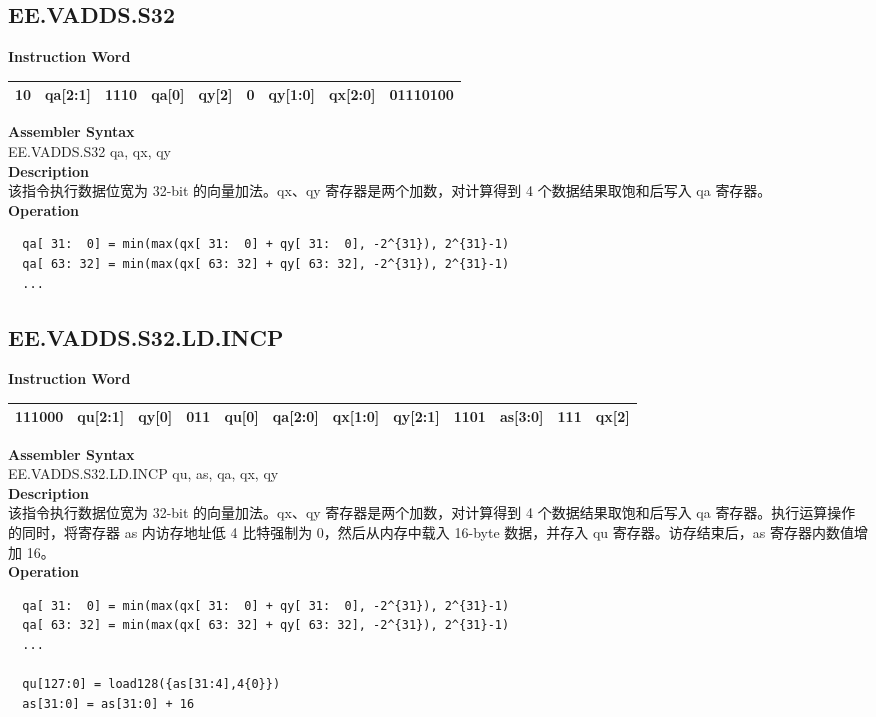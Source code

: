 \clearpage
\subsection{EE.VADDS.S32}\label{instruction:EEVADDSS32}
\setlength\tabcolsep{6pt}
\textbf{Instruction Word} \\
\begin{tabular}{|c|c|c|c|c|c|c|c|c|}
	\hline
	10 & qa[2:1] & 1110 & qa[0] & qy[2] & 0 & qy[1:0] & qx[2:0] & 01110100 \\
	\hline
\end{tabular}

\textbf{Assembler Syntax} \\
EE.VADDS.S32 qa, qx, qy \\
\textbf{Description} \\
该指令执行数据位宽为 32-bit 的向量加法。qx、qy 寄存器是两个加数，对计算得到 4 个数据结果取饱和后写入 qa 寄存器。\\
\textbf{Operation}
\begin{lstlisting}
  qa[ 31:  0] = min(max(qx[ 31:  0] + qy[ 31:  0], -2^{31}), 2^{31}-1)
  qa[ 63: 32] = min(max(qx[ 63: 32] + qy[ 63: 32], -2^{31}), 2^{31}-1)
  ...
\end{lstlisting}

\clearpage
\subsection{EE.VADDS.S32.LD.INCP}\label{instruction:EEVADDSS32LDINCP}
\setlength\tabcolsep{6pt}
\textbf{Instruction Word} \\
\begin{tabular}{|c|c|c|c|c|c|c|c|c|c|c|c|}
	\hline
	111000 & qu[2:1] & qy[0] & 011 & qu[0] & qa[2:0] & qx[1:0] & qy[2:1] & 1101 & as[3:0] & 111 & qx[2] \\
	\hline
\end{tabular}

\textbf{Assembler Syntax} \\
EE.VADDS.S32.LD.INCP qu, as, qa, qx, qy \\
\textbf{Description} \\
该指令执行数据位宽为 32-bit 的向量加法。qx、qy 寄存器是两个加数，对计算得到 4 个数据结果取饱和后写入 qa 寄存器。执行运算操作的同时，将寄存器 as 内访存地址低 4 比特强制为 0，然后从内存中载入 16-byte 数据，并存入 qu 寄存器。访存结束后，as 寄存器内数值增加 16。\\
\textbf{Operation}
\begin{lstlisting}
  qa[ 31:  0] = min(max(qx[ 31:  0] + qy[ 31:  0], -2^{31}), 2^{31}-1)
  qa[ 63: 32] = min(max(qx[ 63: 32] + qy[ 63: 32], -2^{31}), 2^{31}-1)
  ...

  qu[127:0] = load128({as[31:4],4{0}})
  as[31:0] = as[31:0] + 16
\end{lstlisting}

